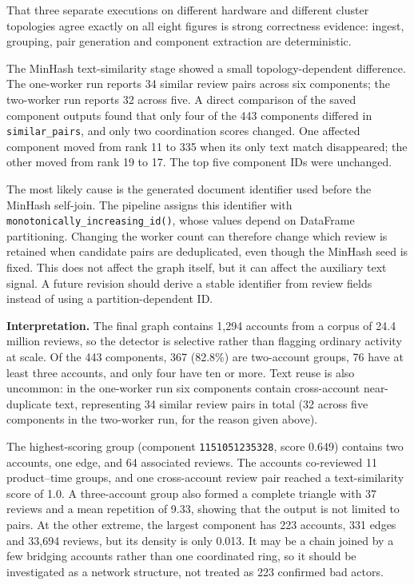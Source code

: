 \documentclass[12pt]{article}
\begin{document}
That three separate executions on different hardware and different cluster
topologies agree exactly on all eight figures is strong correctness evidence:
ingest, grouping, pair generation and component extraction are deterministic.

The MinHash text-similarity stage showed a small topology-dependent difference.
The one-worker run reports 34 similar review pairs across six components; the
two-worker run reports 32 across five. A direct comparison of the saved
component outputs found that only four of the 443 components differed in
\texttt{similar\_pairs}, and only two coordination scores changed. One affected
component moved from rank 11 to 335 when its only text match disappeared; the
other moved from rank 19 to 17. The top five component IDs were unchanged.

The most likely cause is the generated document identifier used before the
MinHash self-join. The pipeline assigns this identifier with
\texttt{monotonically\_increasing\_id()}, whose values depend on DataFrame
partitioning. Changing the worker count can therefore change which review is
retained when candidate pairs are deduplicated, even though the MinHash seed is
fixed. This does not affect the graph itself, but it can affect the auxiliary
text signal. A future revision should derive a stable identifier from review
fields instead of using a partition-dependent ID.

\textbf{Interpretation.} The final graph contains 1{,}294 accounts from a
corpus of 24.4 million reviews, so the detector is selective rather than
flagging ordinary activity at scale. Of the 443 components, 367 (82.8\%) are
two-account groups, 76 have at least three accounts, and only four have ten or
more. Text reuse is also uncommon: in the one-worker run six components
contain cross-account near-duplicate text, representing 34 similar review
pairs in total (32 across five components in the two-worker run, for the
reason given above).

The highest-scoring group (component \texttt{1151051235328}, score 0.649)
contains two accounts, one edge, and 64 associated reviews. The accounts
co-reviewed 11 product--time groups, and one cross-account review pair reached
a text-similarity score of 1.0. A three-account group also formed a complete
triangle with 37 reviews and a mean repetition of 9.33, showing that the output
is not limited to pairs. At the other extreme, the largest component has 223
accounts, 331 edges and 33{,}694 reviews, but its density is only 0.013. It may
be a chain joined by a few bridging accounts rather than one coordinated ring,
so it should be investigated as a network structure, not treated as 223
confirmed bad actors.
\end{document}
